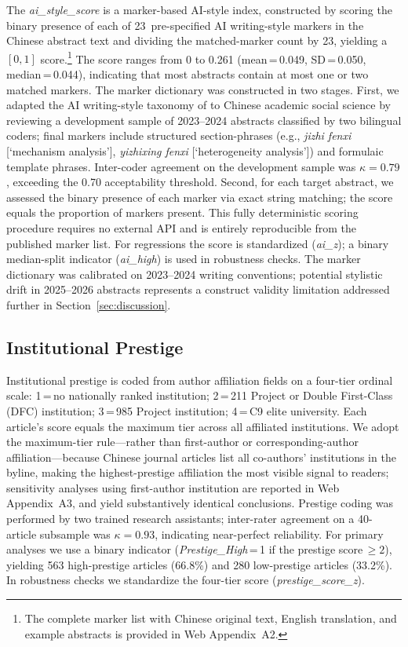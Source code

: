 \documentclass[12pt,a4paper]{article}
\begin{document}
The \textit{ai\_style\_score} is a marker-based AI-style index,
constructed by scoring the binary presence of each of
23~pre-specified AI writing-style markers in the Chinese abstract text
and dividing the matched-marker count by 23, yielding a $[0,1]$
score.\footnote{The complete marker list with Chinese original text,
  English translation, and example abstracts is provided in
  Web Appendix~A2.}
The score ranges from 0 to 0.261 (mean\,=\,0.049, SD\,=\,0.050,
median\,=\,0.044), indicating that most abstracts contain at most
one or two matched markers.
The marker dictionary was constructed in two stages.
First, we adapted the AI writing-style taxonomy of \citet{Liang2024}
to Chinese academic social science by reviewing a development sample
of 2023--2024 abstracts classified by two bilingual coders; final
markers include structured section-phrases
(e.g., \textit{jizhi fenxi} [`mechanism analysis'],
\textit{yizhixing fenxi} [`heterogeneity analysis'])
and formulaic template phrases.
Inter-coder agreement on the development sample was
$\kappa = 0.79$, exceeding the 0.70 acceptability threshold.
Second, for each target abstract, we assessed the binary presence of
each marker via exact string matching; the score equals the proportion
of markers present.
This fully deterministic scoring procedure requires no external API
and is entirely reproducible from the published marker list.
For regressions the score is standardized (\textit{ai\_z}); a binary
median-split indicator (\textit{ai\_high}) is used in robustness checks.
The marker dictionary was calibrated on 2023--2024 writing conventions;
potential stylistic drift in 2025--2026 abstracts represents a
construct validity limitation addressed further in Section~\ref{sec:discussion}.

\subsection{Institutional Prestige}

Institutional prestige is coded from author affiliation fields on a
four-tier ordinal scale: 1\,=\,no nationally ranked institution;
2\,=\,211 Project or Double First-Class (DFC) institution;
3\,=\,985 Project institution; 4\,=\,C9 elite university.
Each article's score equals the maximum tier across all affiliated
institutions.
We adopt the maximum-tier rule---rather than first-author or
corresponding-author affiliation---because Chinese journal articles
list all co-authors' institutions in the byline, making the
highest-prestige affiliation the most visible signal to readers;
sensitivity analyses using first-author institution are reported in
Web Appendix~A3, and yield substantively identical conclusions.
Prestige coding was performed by two trained research assistants;
inter-rater agreement on a 40-article subsample was
$\kappa = 0.93$, indicating near-perfect reliability.
For primary analyses we use a binary indicator
(\textit{Prestige\_High}\,=\,1 if the prestige score\,$\geq 2$),
yielding 563 high-prestige articles (66.8\%) and 280 low-prestige
articles (33.2\%).
In robustness checks we standardize the four-tier score
(\textit{prestige\_score\_z}).
\end{document}
